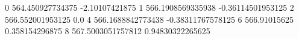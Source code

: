 0 564.450927734375 -2.10107421875
1 566.1908569335938 -0.36114501953125
2 566.552001953125 0.0
4 566.1688842773438 -0.38311767578125
6 566.91015625 0.358154296875
8 567.5003051757812 0.94830322265625
